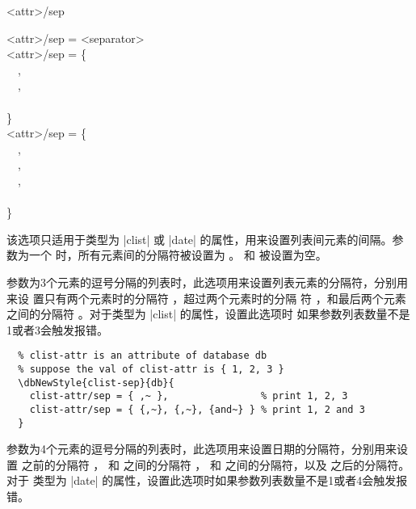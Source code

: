 \documentclass[full]{l3doc}
\begin{document}
\begin{documentation}
\begin{option}[added=2022-01-05, updated=2022-01-08, rEXP]{<attr>/sep}
  \begin{syntax}
    <attr>/sep = <separator> \\
    <attr>/sep = \{ \\
    ~~, \\
    ~~, \\
    ~~ \\
    \} \\
    <attr>/sep = \{ \\
    ~~, \\
    ~~, \\
    ~~, \\
    ~~ \\
    \} \\
  \end{syntax}

  该选项只适用于类型为 |clist| 或 |date| 的属性，用来设置列表间元素的间隔。参
  数为一个  时，所有元素间的分隔符被设置为 。
   和  被设置为空。
\end{option}

  参数为3个元素的逗号分隔的列表时，此选项用来设置列表元素的分隔符，分别用来设
  置只有两个元素时的分隔符 ，超过两个元素时的分隔
  符 ，和最后两个元素之间的分隔符
  。对于类型为 |clist| 的属性，设置此选项时
  如果参数列表数量不是1或者3会触发报错。

\begin{verbatim}
  % clist-attr is an attribute of database db
  % suppose the val of clist-attr is { 1, 2, 3 }
  \dbNewStyle{clist-sep}{db}{
    clist-attr/sep = { ,~ },                % print 1, 2, 3
    clist-attr/sep = { {,~}, {,~}, {and~} } % print 1, 2 and 3
  }
\end{verbatim}

  参数为4个元素的逗号分隔的列表时，此选项用来设置日期的分隔符，分别用来设
  置  之前的分隔符  ， 和
   之间的分隔符  ，
   和  之间的分隔符，以及  之后的分隔符。对于
  类型为 |date| 的属性，设置此选项时如果参数列表数量不是1或者4会触发报错。


\end{documentation}
\end{document}
